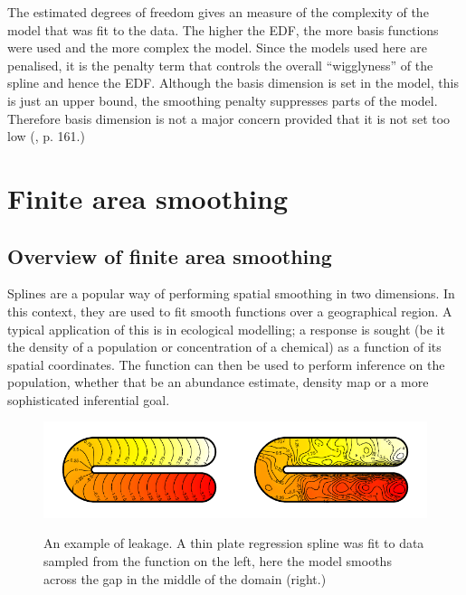 The estimated degrees of freedom gives an measure of the complexity of the model that was fit to the data. The higher the EDF, the more basis functions were used and  the more complex the model.  Since the models used here are penalised, it is the penalty term that controls the overall ``wigglyness'' of the spline and hence the EDF. Although the basis dimension is set in the model, this is just an upper bound, the smoothing penalty suppresses parts of the model. Therefore basis dimension is not a major concern provided that it is not set too low (\cite{simonbook}, p. 161.) 

	\ei
\ei

\section{Finite area smoothing}

\subsection{Overview of finite area smoothing}

Splines are a popular way of performing spatial smoothing in two dimensions. In this context, they are used to fit smooth functions over a geographical region. A typical application of this is in ecological modelling; a response is sought (be it the density of a population or concentration of a chemical) as a function of its spatial coordinates. The function can then be used to perform inference on the population, whether that be an abundance estimate, density map or a more sophisticated inferential goal.

\begin{figure}
\centering
\includegraphics{intro/figs/ramsay-leak.pdf}\\
\caption{An example of leakage. A thin plate regression spline was fit to data sampled from the function on the left, here the model smooths across the gap in the middle of the domain (right.)}
\label{leakage}
\end{figure}

